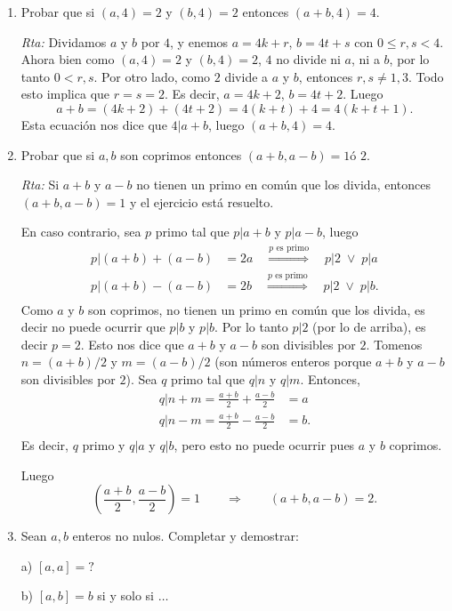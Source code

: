 \documentclass[a4paper,12pt,twoside,spanish,reqno]{amsbook}
\numberwithin{equation}{section}
\newcommand{\rta}{\noindent\textit{Rta: }}
\begin{document}
\begin{enumerate}
\item Probar que si $(a,4)=2$ y $(b,4)=2$ entonces $(a+b,4)=4$.

\rta Dividamos $a$ y $b$ por $4$, y enemos $a = 4k+ r$, $b = 4t + s$ con $ 0 \le r,s < 4$. Ahora bien como  $(a,4)=2$ y $(b,4)=2$, $4$ no divide ni $a$, ni a $b$, por  lo tanto $0 < r,s$. Por otro lado, como $2$ divide a $a$ y $b$,  entonces $r,s \not= 1,3$. Todo esto implica que $r=s=2$. Es decir, $a = 4k+ 2$, $b = 4t + 2$. Luego 
$$
a + b =  ( 4k+ 2) + ( 4t + 2) = 4(k+t) +4 = 4(k+t+1). 
$$
Esta ecuación nos dice que $4| a+b$, luego $(a+b,4)=4$.

\item Probar que si $a,b$ son coprimos entonces $(a+b,a-b)=1 \text{
\'o } 2 $.

\rta Si $a+b$ y $a-b$ no tienen un primo en común que los divida, entonces $(a+b,a-b)=1 $ y el ejercicio está resuelto. 

En caso contrario, sea $p$ primo tal que $p | a+b$ y $p|a-b$, luego 
\begin{align*}
    p|  (a+b) + (a-b) &= 2a \quad \stackrel{\text{$p$ es primo}}{\Longrightarrow} \quad p|2 \;\vee\; p|a \\
    p|  (a+b) - (a-b) &= 2b \quad \stackrel{\text{$p$ es primo}}{\Longrightarrow} \quad p|2 \;\vee\; p|b. \\
\end{align*} 
Como $a$ y $b$ son coprimos, no tienen un primo en común que los divida, es decir no puede ocurrir  que  $p | b$ y $p|b$. Por lo tanto $p|2$ (por lo de arriba),  es decir $p =2$. Esto nos dice que  $a+b$ y $a-b$ son divisibles por $2$. Tomenos $n = (a+b)/2$ y $m = (a-b)/2$  (son números enteros porque  $a+b$ y $a-b$ son divisibles por $2$). Sea $q$ primo tal que $q|n$ y $q|m$. Entonces, 
\begin{align*}
    q| n+m =  \frac{a+b}{2} + \frac{a-b}{2} &= a  \\
    q| n-m =  \frac{a+b}{2} - \frac{a-b}{2} &= b .\\
\end{align*} 
Es  decir, $q$ primo y $q|a$ y $q|b$, pero esto no puede ocurrir pues $a$ y $b$ coprimos. 


Luego
$$
( \frac{a+b}{2}, \frac{a-b}{2}) =1 \qquad \Rightarrow\qquad (a+b,a-b) =2.
$$


\item Sean $a,b$ enteros no nulos. Completar y demostrar:

a)  $[a,a]=?$

b)  $[a,b]=b$ si y solo si $\ldots$


\end{enumerate}
\end{document}
